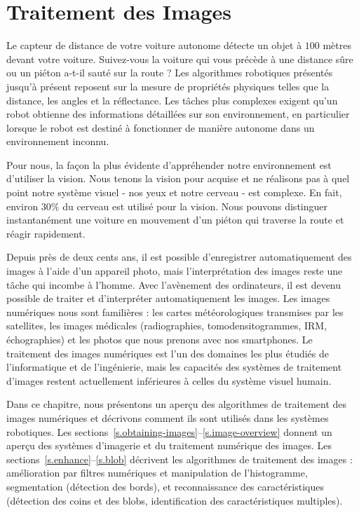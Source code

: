 
\chapter{Traitement des Images}\label{ch.image}

Le capteur de distance de votre voiture autonome détecte un objet à $100$ mètres devant votre voiture. Suivez-vous la voiture qui vous précède à une distance sûre ou un piéton a-t-il sauté sur la route ? Les algorithmes robotiques présentés jusqu'à présent reposent sur la mesure de propriétés physiques telles que la distance, les angles et la réflectance. Les tâches plus complexes exigent qu'un robot obtienne des informations détaillées sur son environnement, en particulier lorsque le robot est destiné à fonctionner de manière autonome dans un environnement inconnu.

Pour nous, la façon la plus évidente d'appréhender notre environnement est d'utiliser la vision. Nous tenons la vision pour acquise et ne réalisons pas à quel point notre système visuel - nos yeux et notre cerveau - est complexe. En fait, environ $30\%$ du cerveau est utilisé pour la vision. Nous pouvons distinguer instantanément une voiture en mouvement d'un piéton qui traverse la route et réagir rapidement.

Depuis près de deux cents ans, il est possible d'enregistrer automatiquement des images à l'aide d'un appareil photo, mais l'interprétation des images reste une tâche qui incombe à l'homme. Avec l'avènement des ordinateurs, il est devenu possible de traiter et d'interpréter automatiquement les images. Les images numériques nous sont familières : les cartes météorologiques transmises par les satellites, les images médicales (radiographies, tomodensitogrammes, IRM, échographies) et les photos que nous prenons avec nos smartphones. Le traitement des images numériques est l'un des domaines les plus étudiés de l'informatique et de l'ingénierie, mais les capacités des systèmes de traitement d’images restent actuellement inférieures à celles du système visuel humain.

Dans ce chapitre, nous présentons un aperçu des algorithmes de traitement des images numériques et décrivons comment ils sont utilisés dans les systèmes robotiques. Les sections~\ref{s.obtaining-images}--\ref{s.image-overview} donnent un aperçu des systèmes d'imagerie et du traitement numérique des images. Les sections~\ref{s.enhance}--\ref{s.blob} décrivent les algorithmes de traitement des images : amélioration par filtres numériques et manipulation de l'histogramme, segmentation (détection des bords), et reconnaissance des caractéristiques (détection des coins et des blobs, identification des caractéristiques multiples).

